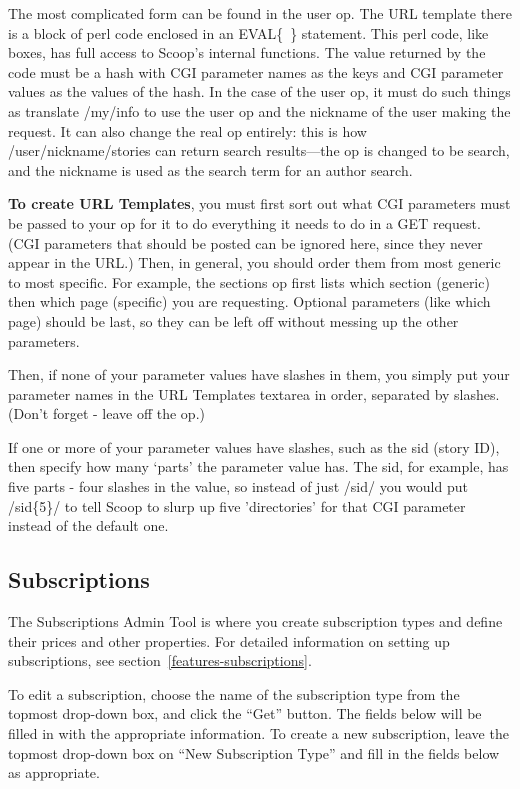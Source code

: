 The most complicated form can be found in the user op. The URL template there is a block of perl code enclosed in an EVAL\{~\} statement. This perl code, like boxes, has full access to Scoop's internal functions. The value returned by the code must be a hash with CGI parameter names as the keys and CGI parameter values as the values of the hash. In the case of the user op, it must do such things as translate /my/info to use the user op and the nickname of the user making the request. It can also change the real op entirely: this is how /user/nickname/stories can return search results---the op is changed to be search, and the nickname is used as the search term for an author search.

{\bf To create URL Templates}, you must first sort out what CGI parameters must be passed to your op for it to do everything it needs to do in a GET request. (CGI parameters that should be posted can be ignored here, since they never appear in the URL.) Then, in general, you should order them from most generic to most specific. For example, the sections op first lists which section (generic) then which page (specific) you are requesting. Optional parameters (like which page) should be last, so they can be left off without messing up the other parameters.

Then, if none of your parameter values have slashes in them, you simply put your parameter names in the URL Templates textarea in order, separated by slashes. (Don't forget - leave off the op.)

If one or more of your parameter values have slashes, such as the sid (story ID), then specify how many `parts' the parameter value has. The sid, for example, has five parts - four slashes in the value, so instead of just /sid/ you would put /sid\{5\}/ to tell Scoop to slurp up five 'directories' for that CGI parameter instead of the default one.

\subsection{Subscriptions}
\label{admin-tools-subscriptions}

The Subscriptions Admin Tool is where you create subscription types and define their prices and other properties. For detailed information on setting up subscriptions, see section~\ref{features-subscriptions}.

To edit a subscription, choose the name of the subscription type from the topmost drop-down box, and click the ``Get'' button. The fields below will be filled in with the appropriate information. To create a new subscription, leave the topmost drop-down box on ``New Subscription Type'' and fill in the fields below as appropriate.

